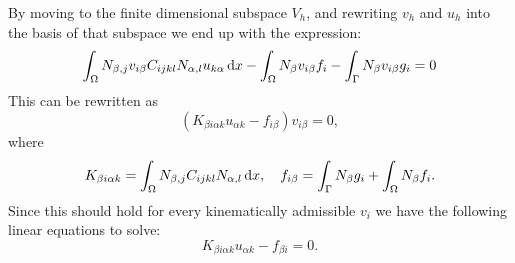 \documentclass[fem.tex]{subfiles}
\begin{document}
%
By moving to the finite dimensional subspace $V_h$, and rewriting $v_h$ and $u_h$ into the basis of that subspace we end up with the expression:
%
\begin{equation} 
\int_\Omega  N_{\beta,j}v_{i\beta}   C_{ijkl} N_{\alpha,l} u_{k\alpha} \, \mathrm{d} x -\int_\Omega N_\beta v_{i\beta} f_i - \int_\Gamma N_\beta v_{i\beta} g_i = 0
\end{equation}
This can be rewritten as
\begin{equation} 
\left( K_{\beta i \alpha k}u_{\alpha k} - f_{i \beta} \right) v_{i\beta} = 0,
\end{equation}
where
\begin{equation} 
K_{\beta i \alpha k} = \int_\Omega  N_{\beta,j}C_{ijkl}N_{\alpha,l}  \, \mathrm{d} x , \quad f_{i \beta} = \int_\Gamma N_\beta g_i + \int_\Omega N_\beta f_i.
\end{equation}
Since this should hold for every kinematically admissible $v_i$ we have the following linear equations to solve:
\begin{equation} 
K_{\beta i \alpha k}u_{\alpha k} - f_{\beta i} = 0.
\end{equation}
\end{document}
